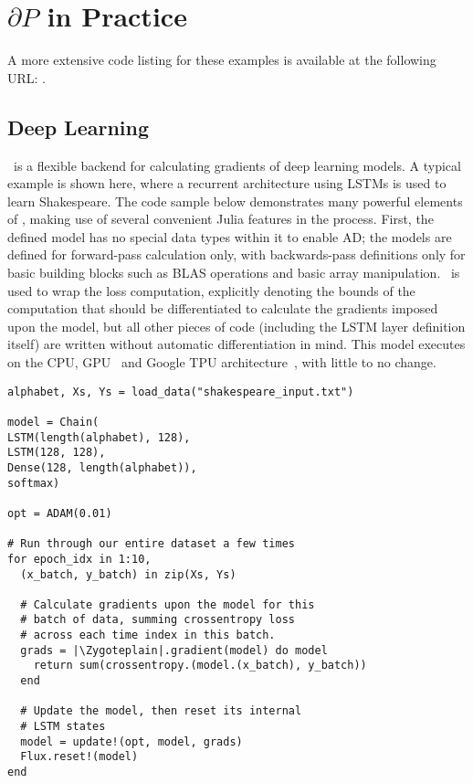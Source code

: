\documentclass{juliacon}
\newcommand{\Zygote}{\iftoggle{anonymous}{$\partial$P.jl}{Zygote}}
\newcommand{\Zygoteplain}{\iftoggle{anonymous}{$\partial$P.jl}{Zygote}}
\begin{document}
\section{$\partial P$ in Practice}

A more extensive code listing for these examples is available at the following URL: \iftoggle{anonymous}{Hidden for review - an anonymized version is included as supplemental material}{https://github.com/MikeInnes/zygote-paper}.

\subsection{Deep Learning}
\label{dl}

\Zygote\ is a flexible backend for calculating gradients of deep learning models. A typical example is shown here, where a recurrent architecture using LSTMs \cite{Hochreiter:1997:lstm} is used to learn Shakespeare.
The code sample below demonstrates many powerful elements of \Zygote, making use of several convenient Julia features in the process.  First, the defined model has no special data types within it to enable AD; the models are defined for forward-pass calculation only, with backwards-pass definitions only for basic building blocks such as BLAS operations and basic array manipulation. \Zygote\ is used to wrap the loss computation, explicitly denoting the bounds of the computation that should be differentiated to calculate the gradients imposed upon the model, but all other pieces of code (including the LSTM layer definition itself) are written without automatic differentiation in mind. This model executes on the CPU, GPU~\cite{Flux.jl-2018} and Google TPU architecture~\cite{XLA.jl-2018}, with little to no change.

\begin{verbatim}
alphabet, Xs, Ys = load_data("shakespeare_input.txt")

model = Chain(
LSTM(length(alphabet), 128),
LSTM(128, 128),
Dense(128, length(alphabet)),
softmax)

opt = ADAM(0.01)

# Run through our entire dataset a few times
for epoch_idx in 1:10,
  (x_batch, y_batch) in zip(Xs, Ys)
  
  # Calculate gradients upon the model for this
  # batch of data, summing crossentropy loss
  # across each time index in this batch.
  grads = |\Zygoteplain|.gradient(model) do model
    return sum(crossentropy.(model.(x_batch), y_batch))
  end
  
  # Update the model, then reset its internal
  # LSTM states
  model = update!(opt, model, grads)
  Flux.reset!(model)
end
\end{verbatim}
\end{document}
